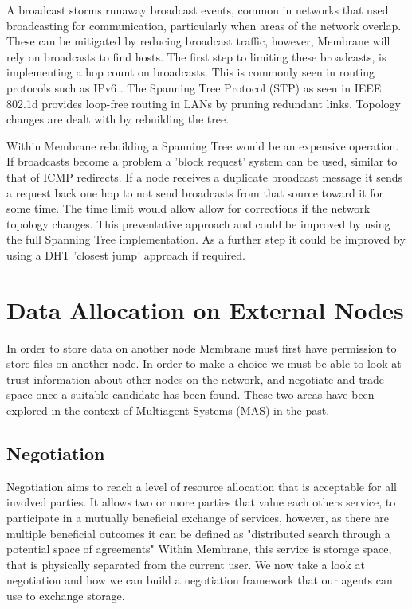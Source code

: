 \documentclass[11pt, a4paper, twocolumn, twoside]{report}
\begin{document}
A broadcast storms runaway broadcast events, common in networks that used broadcasting for communication, particularly when areas of the network overlap. \citep{Tseng:2002:BSP:506900.506905} These can be mitigated by reducing broadcast traffic, however, Membrane will rely on broadcasts to find hosts. The first step to limiting these broadcasts, is implementing a hop count on broadcasts. This is commonly seen in routing protocols such as IPv6 \citep{deering1998internet}. The Spanning Tree Protocol (STP) as seen in IEEE 802.1d \citep*{ieee802ieee, sharma2004viking} provides loop-free routing in LANs by pruning redundant links. Topology changes are dealt with by rebuilding the tree.

Within Membrane rebuilding a Spanning Tree would be an expensive operation. If broadcasts become a problem a 'block request' system can be used, similar to that of ICMP redirects. \citep{postel1981rfc} If a node receives a duplicate broadcast message it sends a request back one hop to not send broadcasts from that source toward it for  some time. The time limit would allow allow for corrections if the network topology changes. This preventative approach and could be improved by using the full Spanning Tree implementation. As a further step it could be improved by using a DHT 'closest jump' approach if required.

\section{Data Allocation on External Nodes}

In order to store data on another node Membrane must first have permission to store files on another node. In order to make a choice we must be able to look at trust information about other nodes on the network, and negotiate and trade space once a suitable candidate has been found. These two areas have been explored in the context of Multiagent Systems (MAS) in the past. \citep{wooldridge2009introduction}

\subsection{Negotiation}

Negotiation aims to reach a level of resource allocation that is acceptable for all involved parties. \citep{rahwan2005interest} It allows two or more parties that value each others service, to participate in a mutually beneficial exchange of services, however, as there are multiple beneficial outcomes it can be defined as "distributed search through a potential space of agreements" \citep{jennings2001automated} Within Membrane, this service is storage space, that is physically separated from the current user. We now take a look at negotiation and how we can build a negotiation framework that our agents can use to exchange storage.
\end{document}
